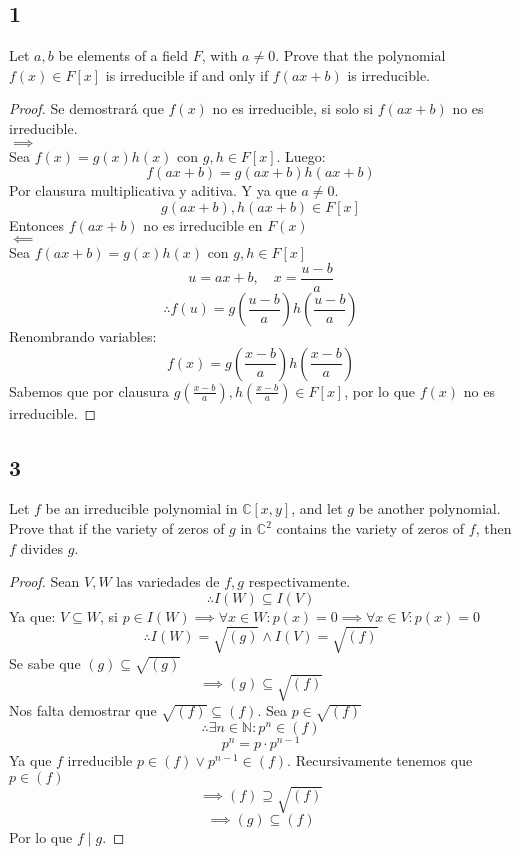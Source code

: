 \documentclass[11pt]{article}
\newcommand{\set}[1]{\mathbb{#1}}
\theoremstyle{definition}
\begin{document}
    \subsection{1}
    Let $a,b$ be elements of a field $F$, with $a \neq 0$. Prove that the polynomial $f(x)\in F[x]$ is irreducible if and only if $f(ax+b)$ is irreducible.
    \begin{proof}
        Se demostrará que $f(x)$ no es irreducible, si solo si $f(ax+b)$ no es irreducible.\\
        $\implies$\\
        Sea $f(x)=g(x)h(x)$ con $g,h\in F[x]$. Luego:
        \[f(ax+b)=g(ax+b)h(ax+b)\]
        Por clausura multiplicativa y aditiva. Y ya que $a\neq 0$.
        \[g(ax+b),h(ax+b)\in F[x]\]
        Entonces $f(ax+b)$ no es irreducible en $F(x)$\\
        $\impliedby$\\
        Sea $f(ax+b)=g(x)h(x)$ con $g,h\in F[x]$
        \[u=ax+b,\quad x=\frac{u-b}{a}\]
        \[\therefore f(u)=g\left(\frac{u-b}{a}\right)h\left(\frac{u-b}{a}\right)\]
        Renombrando variables:
        \[f(x)=g\left(\frac{x-b}{a}\right)h\left(\frac{x-b}{a}\right)\]
        Sabemos que por clausura $g\left(\frac{x-b}{a}\right),h\left(\frac{x-b}{a}\right)\in F[x]$, por lo que $f(x)$ no es irreducible.
    \end{proof}
    \subsection{3}
    Let $f$ be an irreducible polynomial in $\set{C}[x,y]$, and let $g$ be another polynomial. Prove that if the variety of zeros of $g$ in $\set{C}^2$ contains the variety of zeros of $f$, then $f$ divides $g$.
    \begin{proof}
        Sean $V,W$ las variedades de $f,g$ respectivamente.
        \[\therefore I(W)\subseteq I(V)\]
        Ya que: $V\subseteq W$, si $p\in I(W)\implies \forall x\in W: p(x)=0\implies \forall x\in V: p(x)=0$
        \[\therefore I(W)=\sqrt{(g)}\wedge I(V)=\sqrt{(f)}\]
        Se sabe que $(g)\subseteq\sqrt{(g)}$
        \[\implies (g)\subseteq\sqrt{(f)}\]
        Nos falta demostrar que $\sqrt{(f)}\subseteq (f)$. Sea $p\in\sqrt{(f)}$
        \[\therefore \exists n\in\set{N}:p^n\in(f)\]
        \[p^n=p\cdot p^{n-1}\]
        Ya que $f$ irreducible $p\in (f)\vee p^{n-1}\in(f)$. Recursivamente tenemos que $p\in (f)$
        \[\implies (f)\supseteq\sqrt{(f)}\]
        \[\implies (g)\subseteq(f)\]
        Por lo que $f\mid g$.
    \end{proof}
\end{document}
